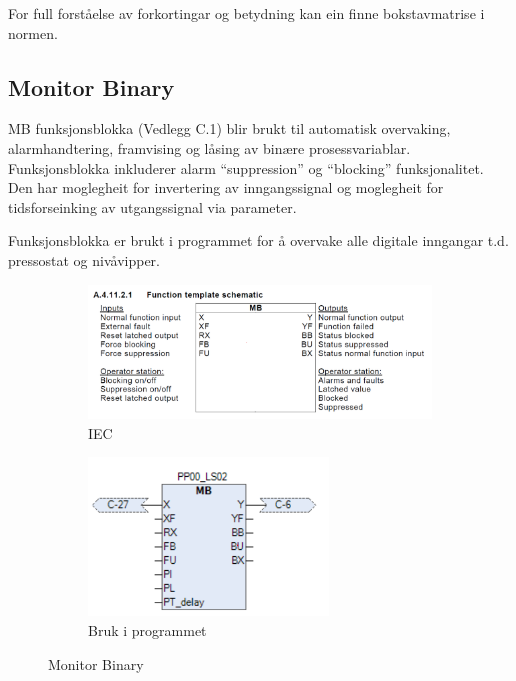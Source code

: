 For full forståelse av forkortingar og betydning kan ein finne bokstavmatrise i normen.


\newpage

\subsection{Monitor Binary}
\gls{MB} funksjonsblokka (Vedlegg C.1) blir brukt til automatisk overvaking, alarmhandtering, framvising og låsing av binære prosessvariablar.
Funksjonsblokka inkluderer alarm ``suppression'' og ``blocking'' funksjonalitet. Den har moglegheit for invertering av 
inngangssignal og moglegheit for tidsforseinking av utgangssignal via parameter.

Funksjonsblokka er brukt i programmet for å overvake alle digitale inngangar t.d. pressostat og nivåvipper.


\begin{figure}[htbp]
    \centering
    \begin{subfigure}[b]{0.45\textwidth}
        \centering
        \includegraphics[width=1\textwidth]{Bilder/MBBlokkIEC.png}
        \caption{IEC}\label{fig:Monitor Binary blokk IEC}
    \end{subfigure}
    \hfill
    \begin{subfigure}[b]{0.45\textwidth}
        \centering
        \includegraphics[width=0.7\textwidth]{Bilder/MBBlokkIProgrammet.png}
        \caption{Bruk i programmet}\label{fig:Monitor Binary blokk i programmet}
    \end{subfigure}
    \caption{Monitor Binary}\label{fig:Monitor Binary}
\end{figure}

